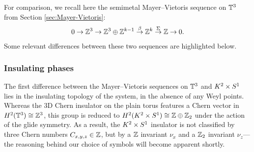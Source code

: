 For comparison, we recall here the semimetal Mayer--Vietoris sequence on $\mathbb{T}^3$ from Section \ref{sec:Mayer-Vietoris}:
\begin{equation}\label{eq:semimetal-MV-explicit-again}
	0 \to \mathbb{Z}^3 \to \mathbb{Z}^3\oplus\mathbb{Z}^{k-1} \overset{\beta}{\to} \mathbb{Z}^k \overset{\Sigma}{\to} \mathbb{Z} \to 0.
\end{equation}
Some relevant differences between these two sequences are highlighted below.

\subsubsection{Insulating phases}

The first difference between the Mayer--Vietoris sequences on $\mathbb{T}^3$ and $K^2\times S^1$ lies in the insulating topology of the system, in the absence of any Weyl points. Whereas the 3D Chern insulator on the plain torus features a Chern vector in $H^2(\mathbb{T}^3)\cong\mathbb{Z}^3$, this group is reduced to $H^2(K^2\times S^1)\cong\mathbb{Z}\oplus\mathbb{Z}_2$ under the action of the glide symmetry. As a result, the $K^2\times S^1$ insulator is not classified by three Chern numbers $C_{x,y,z}\in\mathbb{Z}$, but by a $\mathbb{Z}$ invariant $\nu_x$ and a $\mathbb{Z}_2$ invariant $\nu_z$---the reasoning behind our choice of symbols will become apparent shortly.

